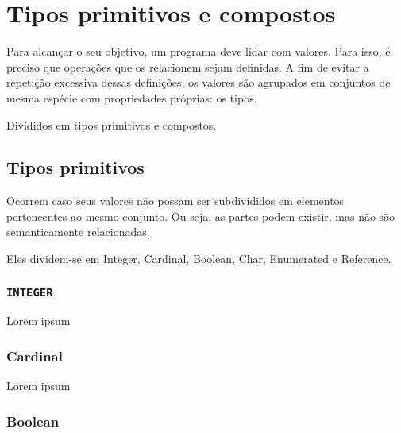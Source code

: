 \documentclass[brazil,times]{abnt}
\begin{document}
\chapter{Tipos primitivos e compostos}
Para alcançar o seu objetivo, um programa deve lidar com valores. Para isso, é preciso que operações que os relacionem sejam definidas. A fim de evitar a repetição excessiva dessas definições, os valores são agrupados em conjuntos de mesma espécie com propriedades próprias: os tipos.

Divididos em tipos primitivos e compostos.  

\section{Tipos primitivos}
Ocorrem caso seus valores não possam ser subdivididos em elementos pertencentes ao mesmo conjunto. Ou seja, as partes podem existir, mas não são semanticamente relacionadas.

Eles dividem-se em Integer, Cardinal, Boolean, Char, Enumerated e Reference.










\subsection{\texttt{INTEGER}}
Lorem ipsum
\subsection{Cardinal}
Lorem ipsum
\subsection{Boolean} 
\end{document}
